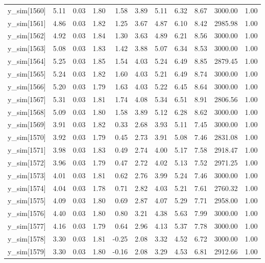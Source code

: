 \begin{table}[ht]
\begin{tabular}{rrrrrrrrrrr}
  y\_sim[1560] & 5.11 & 0.03 & 1.80 & 1.58 & 3.89 & 5.11 & 6.32 & 8.67 & 3000.00 & 1.00 \\ 
  y\_sim[1561] & 4.86 & 0.03 & 1.82 & 1.25 & 3.67 & 4.87 & 6.10 & 8.42 & 2985.98 & 1.00 \\ 
  y\_sim[1562] & 4.92 & 0.03 & 1.84 & 1.30 & 3.63 & 4.89 & 6.21 & 8.56 & 3000.00 & 1.00 \\ 
  y\_sim[1563] & 5.08 & 0.03 & 1.83 & 1.42 & 3.88 & 5.07 & 6.34 & 8.53 & 3000.00 & 1.00 \\ 
  y\_sim[1564] & 5.25 & 0.03 & 1.85 & 1.54 & 4.03 & 5.24 & 6.49 & 8.85 & 2879.45 & 1.00 \\ 
  y\_sim[1565] & 5.24 & 0.03 & 1.82 & 1.60 & 4.03 & 5.21 & 6.49 & 8.74 & 3000.00 & 1.00 \\ 
  y\_sim[1566] & 5.20 & 0.03 & 1.79 & 1.63 & 4.03 & 5.22 & 6.45 & 8.64 & 3000.00 & 1.00 \\ 
  y\_sim[1567] & 5.31 & 0.03 & 1.81 & 1.74 & 4.08 & 5.34 & 6.51 & 8.91 & 2806.56 & 1.00 \\ 
  y\_sim[1568] & 5.09 & 0.03 & 1.80 & 1.58 & 3.89 & 5.12 & 6.28 & 8.62 & 3000.00 & 1.00 \\ 
  y\_sim[1569] & 3.91 & 0.03 & 1.82 & 0.33 & 2.68 & 3.93 & 5.11 & 7.45 & 3000.00 & 1.00 \\ 
  y\_sim[1570] & 3.92 & 0.03 & 1.79 & 0.45 & 2.73 & 3.91 & 5.08 & 7.46 & 2831.08 & 1.00 \\ 
  y\_sim[1571] & 3.98 & 0.03 & 1.83 & 0.49 & 2.74 & 4.00 & 5.17 & 7.58 & 2918.47 & 1.00 \\ 
  y\_sim[1572] & 3.96 & 0.03 & 1.79 & 0.47 & 2.72 & 4.02 & 5.13 & 7.52 & 2971.25 & 1.00 \\ 
  y\_sim[1573] & 4.01 & 0.03 & 1.81 & 0.62 & 2.76 & 3.99 & 5.24 & 7.46 & 3000.00 & 1.00 \\ 
  y\_sim[1574] & 4.04 & 0.03 & 1.78 & 0.71 & 2.82 & 4.03 & 5.21 & 7.61 & 2760.32 & 1.00 \\ 
  y\_sim[1575] & 4.09 & 0.03 & 1.80 & 0.69 & 2.87 & 4.07 & 5.29 & 7.71 & 2958.00 & 1.00 \\ 
  y\_sim[1576] & 4.40 & 0.03 & 1.80 & 0.80 & 3.21 & 4.38 & 5.63 & 7.99 & 3000.00 & 1.00 \\ 
  y\_sim[1577] & 4.16 & 0.03 & 1.79 & 0.64 & 2.96 & 4.13 & 5.37 & 7.78 & 3000.00 & 1.00 \\ 
  y\_sim[1578] & 3.30 & 0.03 & 1.81 & -0.25 & 2.08 & 3.32 & 4.52 & 6.72 & 3000.00 & 1.00 \\ 
  y\_sim[1579] & 3.30 & 0.03 & 1.80 & -0.16 & 2.08 & 3.29 & 4.53 & 6.81 & 2912.66 & 1.00 \\ 

\end{tabular}
\end{table}
